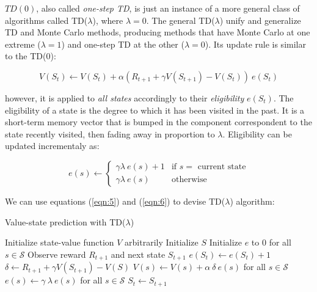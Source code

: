\documentclass{article}
\begin{document}
$TD(0)$, also called \emph{one-step TD}, is just an instance of a more general class of algorithms called TD($\lambda$), where $\lambda = 0$.
The general TD($\lambda$) unify and generalize TD and Monte Carlo methods, producing methods that have Monte Carlo at one extreme ($\lambda = 1$) and one-step TD at the other ($\lambda = 0$).
Its update rule is similar to the TD(0):

\begin{equation}
    V(S_{t}) \leftarrow V(S_{t}) + \alpha (R_{t+1} + \gamma V(S_{t+1}) - V(S_{t})) \: e(S_{t})\label{eqn:5}
\end{equation}

however, it is applied to \emph{all states} accordingly to their \emph{eligibility} $e(S_{t})$.
The eligibility of a state is the degree to which it has been visited in the past.
It is a short-term memory vector that is bumped in the component correspondent to the state recently visited, then fading away in proportion to $\lambda$.
Eligibility can be updated incrementaly as:

\begin{equation}
    e(s) \leftarrow \begin{cases}
                            \gamma \lambda \: e(s) + 1 &\text{if $s =$ current state}\\
                            \gamma \lambda \: e(s) &\text{otherwise}\label{eqn:6}
    \end{cases}
\end{equation}

We can use equations (\ref{eqn:5}) and (\ref{eqn:6}) to devise TD($\lambda$) algorithm:

\begin{algorithm}
    \caption{Value-state prediction with TD($\lambda$)}
    \label{alg:1}
    \begin{algorithmic}
        \State Initialize state-value function $V$ arbitrarily
            \State Initialize $S$
            \State Initialize $e$ to $0$ for all $s \in \mathcal{S}$
             
                \State Observe reward $R_{t+1}$ and next state $S_{t+1}$
                \State $e(S_{t}) \gets e(S_{t}) + 1$
                \State $\delta \gets R_{t+1} + \gamma V(S_{t+1}) - V(S)$
                \State $V(s) \gets V(s) + \alpha \: \delta \: e(s)$ for all $s \in \mathcal{S}$
                \State $e(s) \gets \gamma \: \lambda \: e(s)$ for all $s \in \mathcal{S}$
                \State $S_{t} \gets S_{t+1}$
            \EndFor
        \EndFor
    \end{algorithmic}
\end{algorithm}
\end{document}
